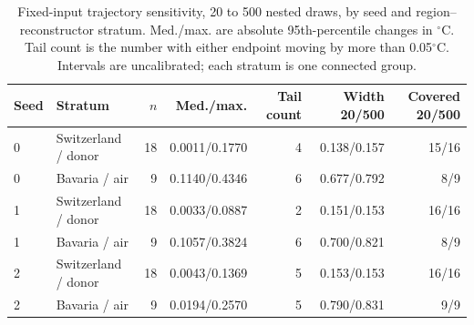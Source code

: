 \begin{table}[p]\centering\small
\caption{Fixed-input trajectory sensitivity, 20 to 500 nested draws, by seed and region--reconstructor stratum. Med./max. are absolute 95th-percentile changes in $^{\circ}$C. Tail count is the number with either endpoint moving by more than 0.05$^{\circ}$C. Intervals are uncalibrated; each stratum is one connected group.}
\label{tab:trajectory-revision}
\begin{tabular}{llrrrrr}
\toprule
Seed & Stratum & $n$ & Med./max. & Tail count & Width 20/500 & Covered 20/500 \\
\midrule
0 & Switzerland / donor & 18 & 0.0011/0.1770 & 4 & 0.138/0.157 & 15/16 \\
0 & Bavaria / air & 9 & 0.1140/0.4346 & 6 & 0.677/0.792 & 8/9 \\
1 & Switzerland / donor & 18 & 0.0033/0.0887 & 2 & 0.151/0.153 & 16/16 \\
1 & Bavaria / air & 9 & 0.1057/0.3824 & 6 & 0.700/0.821 & 8/9 \\
2 & Switzerland / donor & 18 & 0.0043/0.1369 & 5 & 0.153/0.153 & 16/16 \\
2 & Bavaria / air & 9 & 0.0194/0.2570 & 5 & 0.790/0.831 & 9/9 \\
\bottomrule
\end{tabular}
\end{table}
